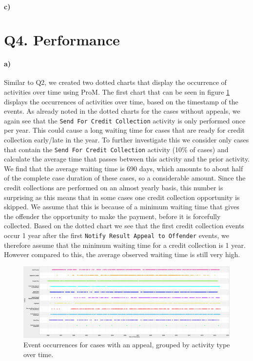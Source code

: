 \documentclass[12pt]{report}
\begin{document}
\paragraph{\textbf{c)}}


\section{Q4. Performance}

\paragraph{\textbf{a)}}

Similar to Q2, we created two dotted charts that display the occurrence of activities over time using ProM. The first chart that can be seen in figure \ref{fig:dotted_timestamp_appeals} displays the occurrences of activities over time, based on the timestamp of the events. As already noted in the dotted charts for the cases without appeals, we again see that the \texttt{Send For Credit Collection} activity is only performed once per year. This could cause a long waiting time for cases that are ready for credit collection early/late in the year. To further investigate this we consider only cases that contain the \texttt{Send For Credit Collection} activity (10\% of cases) and calculate the average time that passes between this activity and the prior activity. We find that the average waiting time is 690 days, which amounts to about half of the complete case duration of these cases, so a considerable amount. Since the credit collections are performed on an almost yearly basis, this number is surprising as this means that in some cases one credit collection opportunity is skipped. We assume that this is because of a minimum waiting time that gives the offender the opportunity to make the payment, before it is forcefully collected. Based on the dotted chart we see that the first credit collection events occur 1 year after the first \texttt{Notify Result Appeal to Offender} events, we therefore assume that the minimum waiting time for a credit collection is 1 year. However compared to this, the average observed waiting time is still very high.
\begin{figure}[H]
  \centering
  \includegraphics[width=\textwidth]{figures/dotted_timestamp_appeals.png}
  \caption{Event occurrences for cases with an appeal, grouped by activity type over time.}
  \label{fig:dotted_timestamp_appeals}
\end{figure}
\end{document}
